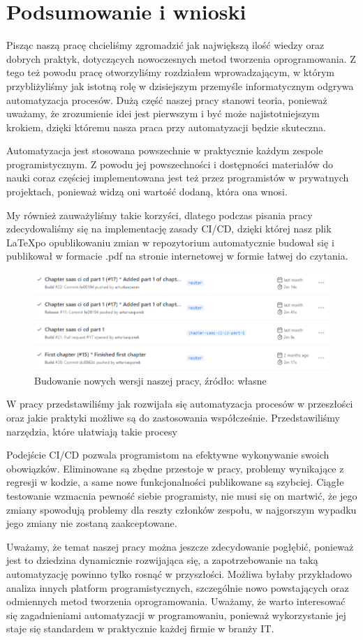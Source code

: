 \section{Podsumowanie i wnioski}
Pisząc naszą pracę chcieliśmy zgromadzić jak największą ilość wiedzy oraz dobrych praktyk, dotyczących nowoczesnych metod tworzenia oprogramowania. Z tego też powodu pracę otworzyliśmy rozdziałem wprowadzającym, w którym przybliżyliśmy jak istotną rolę w dzisiejszym przemyśle informatycznym odgrywa automatyzacja procesów. Dużą część naszej pracy stanowi teoria, ponieważ uważamy, że zrozumienie idei jest pierwszym i być może najistotniejszym krokiem, dzięki któremu nasza praca przy automatyzacji będzie skuteczna.

Automatyzacja jest stosowana powszechnie w praktycznie każdym zespole programistycznym. Z powodu jej powszechności i dostępności materiałów do nauki coraz częściej implementowana jest też przez programistów w prywatnych projektach, ponieważ widzą oni wartość dodaną, która ona wnosi. 

My również zauważyliśmy takie korzyści, dlatego podczas pisania pracy zdecydowaliśmy się na implementację zasady CI/CD, dzięki której nasz plik \LaTeX po opublikowaniu zmian w repozytorium automatycznie budował się i publikował w formacie .pdf na stronie internetowej w formie łatwej do czytania. 

\begin{figure}[htbp]
    \centering
    \includegraphics[width=12cm]{images/podsumowanie.png}
    \caption{Budowanie nowych wersji naszej pracy, źródło: własne}
    \label{fig:podsumowanie}
\end{figure}

W pracy przedstawiliśmy jak rozwijała się automatyzacja procesów w przeszłości oraz jakie praktyki możliwe są do zastosowania współcześnie. Przedstawiliśmy narzędzia, które ułatwiają takie procesy 

Podejście CI/CD pozwala programistom na efektywne wykonywanie swoich obowiązków. Eliminowane są zbędne przestoje w pracy, problemy wynikające z regresji w kodzie, a same nowe funkcjonalności publikowane są szybciej. Ciągłe testowanie wzmacnia pewność siebie programisty, nie musi się on martwić, że jego zmiany spowodują problemy dla reszty członków zespołu, w najgorszym wypadku jego zmiany nie zostaną zaakceptowane. 

Uważamy, że temat naszej pracy można jeszcze zdecydowanie pogłębić, ponieważ jest to dziedzina dynamicznie rozwijająca się, a zapotrzebowanie na taką automatyzację powinno tylko rosnąć w przyszłości. Możliwa byłaby przykładowo analiza innych platform programistycznych, szczególnie nowo powstających oraz odmiennych metod tworzenia oprogramowania. Uważamy, że warto interesować się zagadnieniami automatyzacji w programowaniu, ponieważ wykorzystanie jej staje się standardem w praktycznie każdej firmie w branży IT.